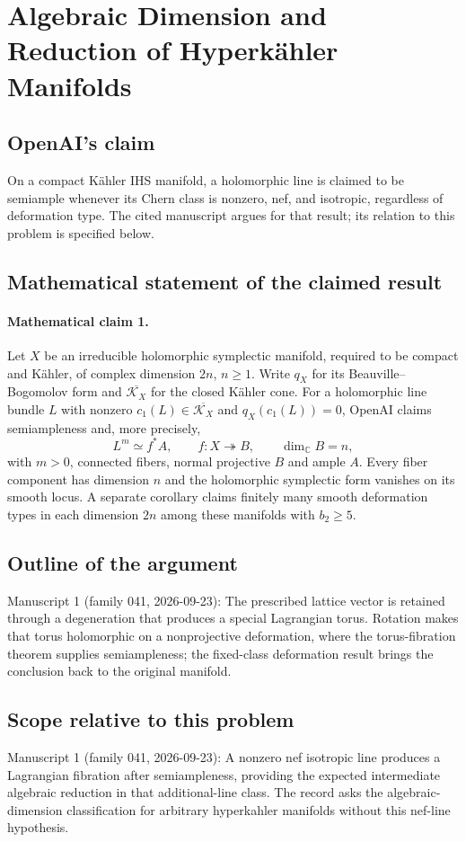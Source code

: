 \documentclass[11pt]{article}
\begin{document}
\section*{Algebraic Dimension and Reduction of Hyperkähler Manifolds}

\subsection{OpenAI's claim}
On a compact Kähler IHS manifold, a holomorphic line is claimed to be semiample whenever its Chern class is nonzero, nef, and isotropic, regardless of deformation type. The cited manuscript argues for that result; its relation to this problem is specified below.

\subsection{Mathematical statement of the claimed result}
\paragraph{Mathematical claim 1.} Let $X$ be an irreducible holomorphic symplectic manifold, required to be compact and Kähler, of complex dimension $2n$, $n\ge1$. Write $q_X$ for its Beauville--Bogomolov form and $\overline{\mathcal K_X}$ for the closed Kähler cone. For a holomorphic line bundle $L$ with nonzero $c_1(L)\in\overline{\mathcal K_X}$ and $q_X(c_1(L))=0$, OpenAI claims semiampleness and, more precisely,
\[
L^m\simeq f^*A,\qquad f:X\twoheadrightarrow B,\qquad\dim_{\mathbb C}B=n,
\]
with $m>0$, connected fibers, normal projective $B$ and ample $A$. Every fiber component has dimension $n$ and the holomorphic symplectic form vanishes on its smooth locus. A separate corollary claims finitely many smooth deformation types in each dimension $2n$ among these manifolds with $b_2\ge5$.

\subsection{Outline of the argument}
Manuscript 1 (family 041, 2026-09-23): The prescribed lattice vector is retained through a degeneration that produces a special Lagrangian torus. Rotation makes that torus holomorphic on a nonprojective deformation, where the torus-fibration theorem supplies semiampleness; the fixed-class deformation result brings the conclusion back to the original manifold.

\subsection{Scope relative to this problem}
Manuscript 1 (family 041, 2026-09-23): A nonzero nef isotropic line produces a Lagrangian fibration after semiampleness, providing the expected intermediate algebraic reduction in that additional-line class. The record asks the algebraic-dimension classification for arbitrary hyperkahler manifolds without this nef-line hypothesis.
\end{document}
